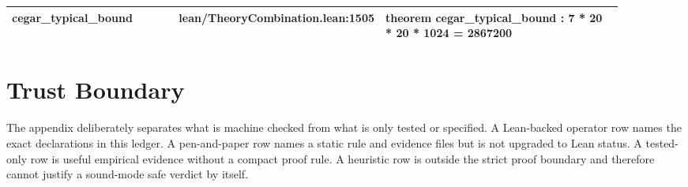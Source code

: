 \documentclass[10pt]{article}
\begin{document}
\begin{longtable}{|p{0.30\linewidth}|p{0.13\linewidth}|p{0.47\linewidth}|}
\hline
cegar\_typical\_bound & lean/TheoryCombination.lean:1505 & theorem cegar\_typical\_bound : 7 * 20 * 20 * 1024 = 2867200 \\
\hline
\end{longtable}

\section{Trust Boundary}
The appendix deliberately separates what is machine checked from what is only tested or specified.  A Lean-backed operator row names the exact declarations in this ledger.  A pen-and-paper row names a static rule and evidence files but is not upgraded to Lean status. A tested-only row is useful empirical evidence without a compact proof rule.  A heuristic row is outside the strict proof boundary and therefore cannot justify a sound-mode safe verdict by itself.
\end{document}
